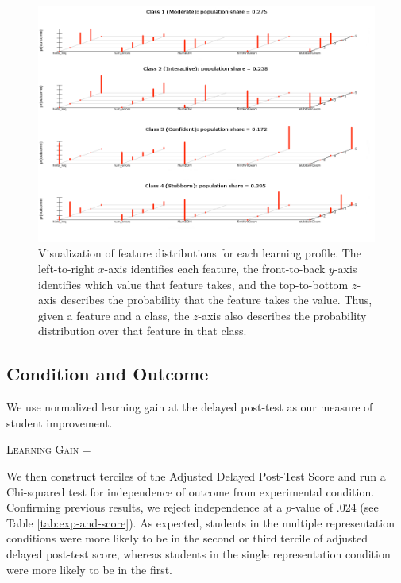 \documentclass{edm_template}
\begin{document}
\begin{figure}[t]
\centering
\includegraphics[scale=0.5]{lca-class-viz.png}
\caption{Visualization of feature distributions for each learning profile. The left-to-right $x$-axis identifies each feature, the front-to-back $y$-axis identifies which value that feature takes, and the top-to-bottom $z$-axis describes the probability that the feature takes the value. Thus, given a feature and a class, the $z$-axis also describes the probability distribution over that feature in that class.}
\label{fig:LCA-class-viz}
\end{figure}


\subsection{Condition and Outcome} 
We use normalized learning gain at the delayed post-test as our measure of student improvement. 
\begin{center}
\textsc{Learning Gain} = 
\end{center}

We then construct terciles of the Adjusted Delayed Post-Test Score and run a Chi-squared test for independence of outcome from experimental condition. Confirming previous results, we reject independence at a $p$-value of .024 (see Table \ref{tab:exp-and-score}). As expected, students in the multiple representation conditions were more likely to be in the second or third tercile of adjusted delayed post-test score, whereas students in the single representation condition were more likely to be in the first.
\end{document}
